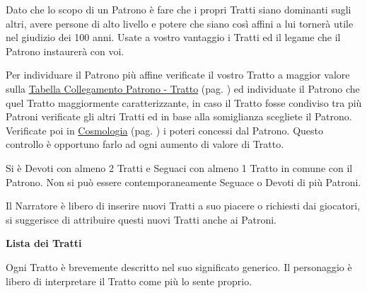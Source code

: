 \begin{multicols}{2}
Dato che lo scopo di un Patrono è fare che i propri Tratti siano dominanti sugli altri, avere persone di alto livello e potere che siano così affini a lui tornerà utile nel giudizio dei 100 anni. Usate a vostro vantaggio i Tratti ed il legame che il Patrono instaurerà con voi.

Per individuare il Patrono più affine verificate il vostro Tratto a maggior valore sulla \hyperlink{tabellacollegamentopatronotratto}{Tabella Collegamento Patrono - Tratto} (pag. \pageref{tabellacollegamentopatronotratto}) ed individuate il Patrono che quel Tratto maggiormente caratterizzante, in caso il Tratto fosse condiviso tra più Patroni verificate gli altri Tratti ed in base alla somiglianza scegliete il Patrono. Verificate poi in \hyperlink{cosmologia}{Cosmologia} (pag. \pageref{patroni}) i poteri concessi dal Patrono. Questo controllo è opportuno farlo ad ogni aumento di valore di Tratto.

Si è Devoti con almeno 2 Tratti e Seguaci con almeno 1 Tratto in comune con il Patrono. Non si può essere contemporaneamente Seguace o Devoti di più Patroni.

Il Narratore è libero di inserire nuovi Tratti a suo piacere o richiesti dai giocatori, si suggerisce di attribuire questi nuovi Tratti anche ai Patroni.

\medskip

\textbf{Lista dei Tratti}

Ogni Tratto è brevemente descritto nel suo significato generico. Il personaggio è libero di interpretare il Tratto come più lo sente proprio.

\medskip


\end{multicols}
